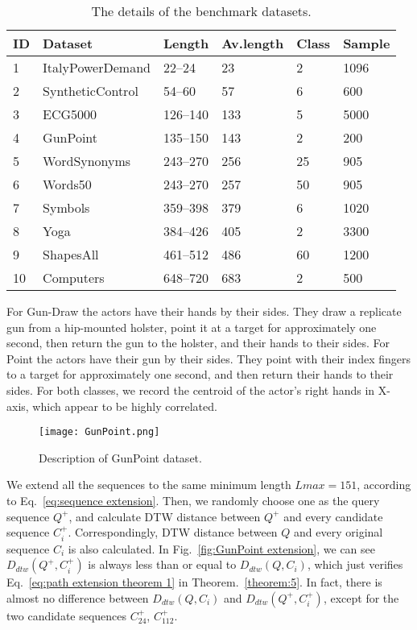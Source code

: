 \documentclass[10pt,journal,compsoc]{IEEEtran}
\begin{document}
\begin{table}[H]
\centering
\caption{The details of the benchmark datasets.}\label{tab:datasets}
\begin{tabular}{p{0.3cm}<{\centering}p{2cm}p{1.2cm}<{\centering}p{1cm}<{\centering}p{0.8cm}<{\centering}p{0.9cm}<{\centering}}
\hline
\textbf{ID} & \textbf{Dataset} & \textbf{Length} & \textbf{Av.length} &	\textbf{Class} &	\textbf{Sample} \\
\hline
1  & ItalyPowerDemand  &22--24 &23 &2 &1096 \\
2  & SyntheticControl  &54--60 &57 &6 &600 \\
3  & ECG5000  &126--140 &133 &5 &5000 \\
4  & GunPoint  &135--150 &143 &2 &200 \\
5  & WordSynonyms  &243--270 &256 &25 &905 \\
6  & Words50  &243--270 &257 &50 &905 \\
7 & Symbols  &359--398 &379 &6  &1020 \\
8 & Yoga  &384--426 &405 &2 &3300 \\
9 & ShapesAll  &461--512 &486 &60 &1200 \\
10 & Computers  &648--720 &683 &2 &500 \\
\hline
\end{tabular}
\end{table}

For Gun-Draw the actors have their hands by their sides.
They draw a replicate gun from a hip-mounted holster, point it at a target for approximately one second,
then return the gun to the holster, and their hands to their sides.
For Point the actors have their gun by their sides.
They point with their index fingers to a target for approximately one second, and then return their hands to their sides.
For both classes, we record the centroid of the actor's right hands in X-axis, which appear to be highly correlated.

\begin{figure}[htbp]
  \centering
  \texttt{[image: GunPoint.png]}
  \caption{Description of GunPoint dataset.}
  \label{fig:GunPoint}
\end{figure}


We extend all the sequences to the same minimum length $Lmax=151$, according to Eq.~\eqref{eq:sequence extension}.
Then, we randomly choose one as the query sequence $Q^+$,
and calculate DTW distance between $Q^+$ and every candidate sequence $C^+_i$.
Correspondingly, DTW distance between $Q$ and every original sequence $C_i$ is also calculated.
In Fig.~\ref{fig:GunPoint extension},
we can see $D_{dtw}(Q^+,C^+_i)$ is always less than or equal to $D_{dtw}(Q,C_i)$,
which just verifies Eq.~\eqref{eq:path extension theorem 1} in Theorem.~\ref{theorem:5}.
In fact, there is almost no difference between $D_{dtw}(Q,C_i)$ and $D_{dtw}(Q^+,C^+_i)$,
except for the two candidate sequences $C^+_{24}$, $C^+_{112}$.
\end{document}
